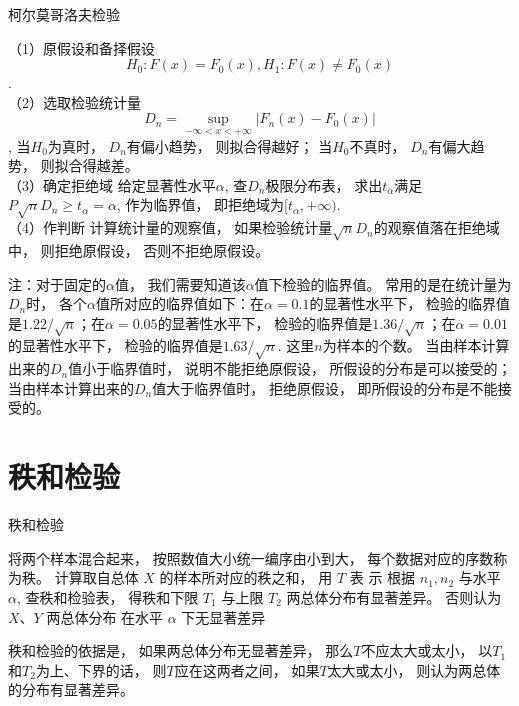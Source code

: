 \begin{algorithm}[]
    \caption{柯尔莫哥洛夫检验}
     （1）原假设和备择假设
\begin{equation}  H_0:F(x)=F_0(x), H_1:F(x)\neq F_0(x)\end{equation}.\\
（2）选取检验统计量
\begin{equation}D_n=\operatorname{sup}_{-\infty<x<+\infty} \left|F_n(x)-F_0(x)\right|\end{equation}, 
当$H_0$为真时， $D_n$有偏小趋势， 则拟合得越好；
当$H_0$不真时， $D_n$有偏大趋势， 则拟合得越差。 \\
（3）确定拒绝域
给定显著性水平$\alpha$, 查$D_n$极限分布表， 求出$t_\alpha$满足
$P{\sqrt n D_n\geq t_\alpha}=\alpha$, 
作为临界值， 即拒绝域为$[t_\alpha,+\infty)$. \\
（4）作判断
计算统计量的观察值， 如果检验统计量$\sqrt n D_n$的观察值落在拒绝域中， 则拒绝原假设， 否则不拒绝原假设。    
\end{algorithm}

注：对于固定的$\alpha$值， 我们需要知道该$\alpha$值下检验的临界值。 常用的是在统计量为$D_n$时， 各个$\alpha$值所对应的临界值如下：在$\alpha=0.1$的显著性水平下， 检验的临界值是$1.22/\sqrt n$；在$\alpha=0.05$的显著性水平下， 检验的临界值是$1.36/\sqrt n$；在$\alpha=0.01$的显著性水平下， 检验的临界值是$1.63/\sqrt n$. 这里$n$为样本的个数。 当由样本计算出来的$D_n$值小于临界值时， 说明不能拒绝原假设， 所假设的分布是可以接受的；当由样本计算出来的$D_n$值大于临界值时， 拒绝原假设， 即所假设的分布是不能接受的。 

\section{秩和检验}

\begin{algorithm}\caption{秩和检验}
将两个样本混合起来， 按照数值大小统一编序由小到大， 每个数据对应的序数称为秩。 \;
计算取自总体 $  X  $ 的样本所对应的秩之和， 用 $  {T}  $ 表 示\;
根据 $  {n}_{1}, {n}_{2}  $ 与水平 $  \alpha  $, 查秩和检验表， 得秩和下限 $  {T}_{1}  $ 与上限 $  {T}_{{2}}  $ \;
两总体分布有显著差异。 否则认为 $  X 、 Y  $ 两总体分布
在水平 $  \alpha  $ 下无显著差异\;
\end{algorithm}

秩和检验的依据是， 如果两总体分布无显著差异， 那么$T$不应太大或太小， 以$T_1$和$T_2$为上、下界的话， 则$T$应在这两者之间， 如果$T$太大或太小， 则认为两总体的分布有显著差异。 

